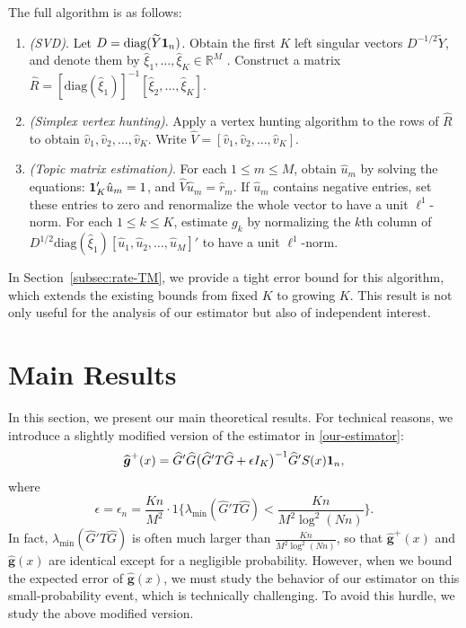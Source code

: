 \documentclass[preprint,11pt]{article}
\def\r#1{\textcolor{red}{\bf #1}}
\numberwithin{equation}{section}
\newcommand{\beq}{\begin{equation}}
\newcommand{\eeq}{\end{equation}}
\newcommand{\diag}{\mathrm{diag}}
\begin{document}
%
The full algorithm is as follows: 
\begin{enumerate}
\item {\it (SVD)}. Let $D=\diag(\widetilde{Y}{\bf 1}_n)$. Obtain the first $K$ left singular vectors $D^{-1/2}\widetilde{Y}$, and denote them by $\hat{\xi}_1, \ldots, \hat{\xi}_K\in\mathbb{R}^M$ . Construct a matrix $\widehat{R}=[\mathrm{diag}(\hat{\xi}_1)]^{-1}[\hat{\xi}_2, \ldots, \hat{\xi}_K]$. 
\item {\it (Simplex vertex hunting)}. Apply a vertex hunting algorithm \citep[Section 3.4]{ke2023special} to the rows of $\widehat{R}$ %
to obtain $\hat{v}_1, \hat{v}_2, \ldots, \hat{v}_K$. %
Write $\widehat{V}=[\hat{v}_1, \hat{v}_2, \ldots, \hat{v}_K]$. 

\item {\it (Topic matrix estimation)}. For each $1\leq m\leq M$, obtain $\hat{u}_m$ by solving the equations: $
{\bf 1}_K'\hat{u}_m=1$, and $\widehat{V}\hat{u}_m = \hat{r}_m$. 
If $\hat{u}_m$  contains negative entries, set these entries to zero and renormalize the whole vector to have a unit $\ell^1$-norm. For each $1\leq k\leq K$, estimate $g_k$ by normalizing the $k$th column of $D^{1/2}\diag(\hat{\xi}_1)[\hat{u}_1, \hat{u}_2, \ldots, \hat{u}_M]'$ to have a unit $\ell^1$-norm. 
\end{enumerate}
In Section~\ref{subsec:rate-TM}, we provide a tight error bound for this algorithm, which extends the existing bounds from fixed $K$ \citep{ke2024entry} to growing $K$. This result is not only useful for the analysis of our estimator but also of independent interest. 


\section{Main Results} \label{sec:main}
In this section, we present our main theoretical results. For technical reasons, we introduce a slightly modified version of the estimator in \eqref{our-estimator}:
\beq \label{our-estimator2}
\widehat{\boldsymbol g}^+(x) = \widehat{G}'\widehat{G}\bigl(\widehat{G}'T\widehat{G} + \epsilon I_K \bigr)^{-1}\widehat{G}'S(x) {\bf 1}_n, 
\eeq
where
\[
\epsilon=\epsilon_n=  \frac{Kn}{M^2}\cdot 1\biggl\{\lambda_{\min}(\widehat{G}'T\widehat{G}) <  \frac{Kn}{M^2\log^2(Nn)}\biggr\}.  
\]
In fact, $\lambda_{\min}(\widehat{G}'T\widehat{G})$ is often much larger than $\frac{Kn}{M^2\log^2(Nn)}$, so that $\widehat{\boldsymbol g}^+(x)$ and $\widehat{\boldsymbol g}(x)$ are identical except for a negligible probability. However, when we bound the expected error of $\widehat{\boldsymbol g}(x)$, we must study the behavior of our estimator on this small-probability event, which is technically challenging. 
To avoid this hurdle, we study the above modified version. 
 
\end{document}

